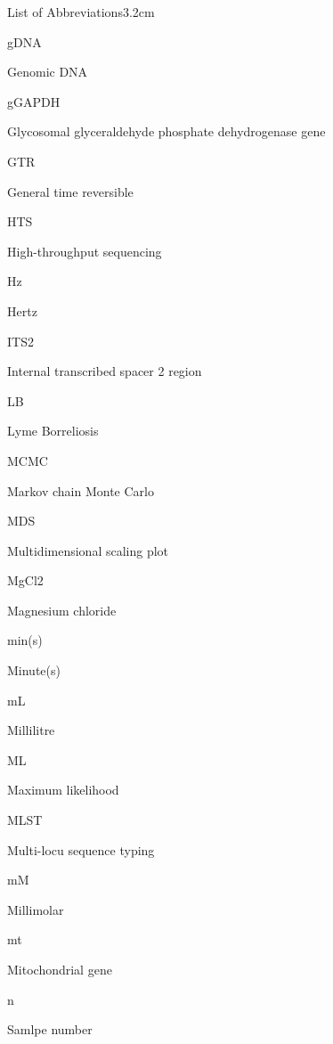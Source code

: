 \documentclass[a4paper, nobind]{templates/ociamthesis}
\begin{document}
\begin{romanpages}
\begin{mclistof}{List of Abbreviations}{3.2cm}
\item[gDNA]

Genomic DNA

\item[gGAPDH]

Glycosomal glyceraldehyde phosphate dehydrogenase gene

\item[GTR]

General time reversible

\item[HTS]

High-throughput sequencing

\item[Hz]

Hertz

\item[ITS2]

Internal transcribed spacer 2 region

\item[LB]

Lyme Borreliosis

\item[MCMC]

Markov chain Monte Carlo

\item[MDS]

Multidimensional scaling plot

\item[MgCl2]

Magnesium chloride

\item[min(s)]

Minute(s)

\item[mL]

Millilitre

\item[ML]

Maximum likelihood

\item[MLST]

Multi-locu sequence typing

\item[mM]

Millimolar

\item[mt]

Mitochondrial gene

\item[n]

Samlpe number


\end{mclistof}
\end{romanpages}
\end{document}
